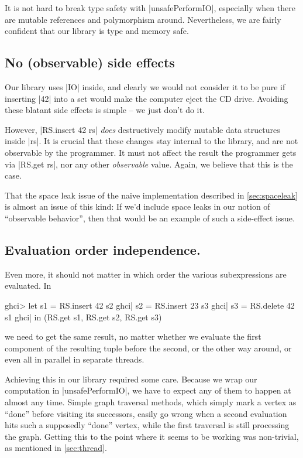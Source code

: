 \documentclass[manuscript,anonymous,screen,acmsmall]{acmart}
\begin{document}
It is not hard to break type safety with |unsafePerformIO|, especially when there are mutable references and polymorphism around. Nevertheless, we are fairly confident that our library is type and memory safe.

\subsection{No (observable) side effects}

Our library uses |IO| inside, and clearly we would not consider it to be pure if inserting |42| into a set would make the computer eject the CD drive. Avoiding these blatant side effects is simple -- we just don't do it.

However, |RS.insert 42 rs| \emph{does} destructively modify mutable data structures inside |rs|. It is crucial that these changes stay internal to the library, and are not observable by the programmer. It must not affect the result the programmer gets via |RS.get rs|, nor any other \emph{observable} value. Again, we believe that this is the case.

That the space leak issue of the naive implementation described in \cref{sec:spaceleak} is almost an issue of this kind: If we’d include space leaks in our notion of “observable behavior”, then that would be an example of such a side-effect issue.

\subsection{Evaluation order independence.}

Even more, it should not matter in which order the various subexpressions are evaluated. In
\begin{code}
ghci> let  s1 = RS.insert 42 s2
ghci|      s2 = RS.insert 23 s3
ghci|      s3 = RS.delete 42 s1
ghci| in (RS.get s1, RS.get s2, RS.get s3)
\end{code}
we need to get the same result, no matter whether we evaluate the first component of the resulting tuple before the second, or the other way around, or even all in parallel in separate threads.

Achieving this in our library required some care. Because we wrap our computation in |unsafePerformIO|, we have to expect any of them to happen at almost any time. Simple graph traversal methods, which simply mark a vertex as “done” before visiting its successors, easily go wrong when a second evaluation hits such a supposedly “done” vertex, while the first traversal is still processing the graph. Getting this to the point where it seems to be working was non-trivial, as mentioned in \cref{sec:thread}.
\end{document}
